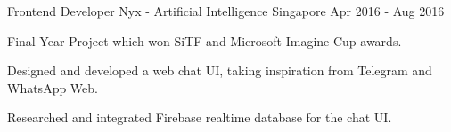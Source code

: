 \begin{cventries}
  \cventry
    {Frontend Developer} %
    {Nyx - Artificial Intelligence} %
    {Singapore} %
    {Apr 2016 - Aug 2016} %
    {
      \begin{cvitems} %
        \item {Final Year Project which won SiTF and Microsoft Imagine Cup awards.}
        \item {Designed and developed a web chat UI, taking inspiration from Telegram and WhatsApp Web.}
        \item {Researched and integrated Firebase realtime database for the chat UI.}
      \end{cvitems}
    }

\end{cventries}
